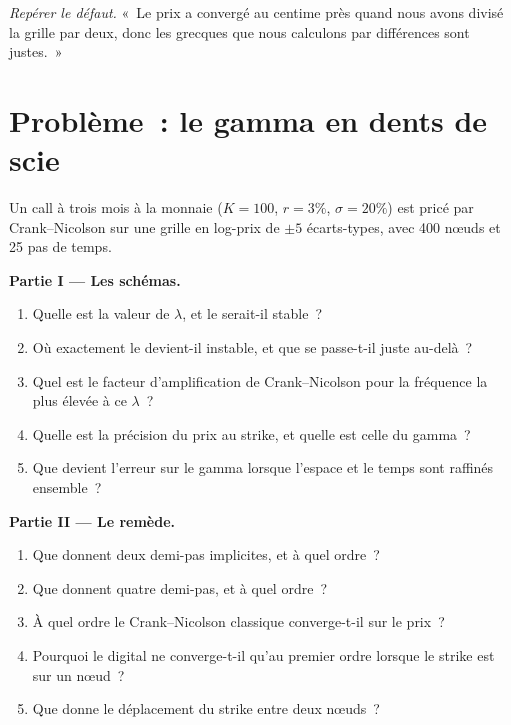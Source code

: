 \begin{exercise}[$\star\star\star$]\label{exo:qm:finite-difference-methods:8}
\emph{Repérer le défaut.} «~Le prix a convergé au centime près quand nous avons divisé la grille par deux, donc les grecques que nous calculons par différences sont justes.~»
\end{exercise}

\section{Problème~: le gamma en dents de scie}

\begin{problem}\label{pb:qm:finite-difference-methods:1}
Un call à trois mois à la monnaie ($K = 100$, $r = 3\%$, $\sigma = 20\%$) est pricé par Crank--Nicolson sur une grille en log-prix de $\pm5$ écarts-types, avec 400 nœuds et 25 pas de temps.

\medskip\noindent\textbf{Partie I --- Les schémas.}
\begin{enumerate}
\item Quelle est la valeur de $\lambda$, et le  serait-il stable~?
\item Où exactement le  devient-il instable, et que se passe-t-il juste au-delà~?
\item Quel est le facteur d'amplification de Crank--Nicolson pour la fréquence la plus élevée à ce $\lambda$~?
\item Quelle est la précision du prix au strike, et quelle est celle du gamma~?
\item Que devient l'erreur sur le gamma lorsque l'espace et le temps sont raffinés ensemble~?
\end{enumerate}

\medskip\noindent\textbf{Partie II --- Le remède.}
\begin{enumerate}[resume]
\item Que donnent deux demi-pas implicites, et à quel ordre~?
\item Que donnent quatre demi-pas, et à quel ordre~?
\item À quel ordre le Crank--Nicolson classique converge-t-il sur le prix~?
\item Pourquoi le digital ne converge-t-il qu'au premier ordre lorsque le strike est sur un nœud~?
\item Que donne le déplacement du strike entre deux nœuds~?
\end{enumerate}


\end{problem}
